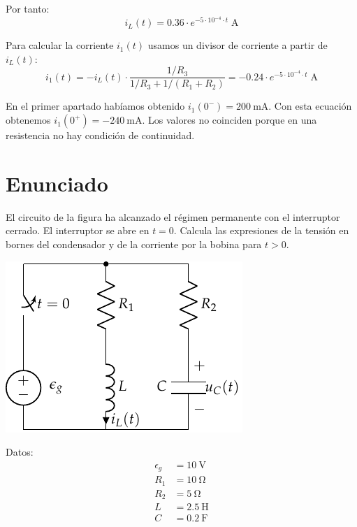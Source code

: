 Por tanto:
\begin{equation*}
  i_L(t) = 0.36 \cdot e^{-5 \cdot 10^{-4} \cdot t}\;\si{\ampere}
\end{equation*}

\vspace{2mm}
Para calcular la corriente $i_1(t)$ usamos un divisor de corriente a
partir de $i_L(t)$:
\begin{equation*}
  i_1(t) = -i_L(t) \cdot \frac{1/R_3}{1/R_3 + 1/(R_1 + R_2)} = -0.24 \cdot e^{-5 \cdot 10^{-4} \cdot t}\;\si{\ampere}
\end{equation*}

\vspace{3mm}
En el primer apartado habíamos obtenido
$i_1(0^-) = \SI{200}{\milli\ampere}$. Con esta ecuación obtenemos
$i_1(0^+) = -\SI{240}{\milli\ampere}$. Los valores no coinciden porque
en una resistencia no hay condición de continuidad.

\section{Enunciado}

El circuito de la figura ha alcanzado el régimen permanente con el
interruptor cerrado. El interruptor se abre en $t = 0$. Calcula las
expresiones de la tensión en bornes del condensador y de la corriente
por la bobina para $t > 0$.

\vspace{4mm}

\begin{minipage}{0.7\textwidth}
  \includegraphics[scale=1]{figuras/FM_4_8}
\end{minipage}
\hfill
\begin{minipage}{0.3\textwidth}
  Datos:
  \begin{align*}
    \epsilon_g &= \SI{10}{\volt}\\
    R_1 &= \SI{10}{\ohm}\\
    R_2 &= \SI{5}{\ohm}\\
    L &= \SI{2.5}{\henry}\\
    C &= \SI{0.2}{\farad}      
  \end{align*}
\end{minipage}

